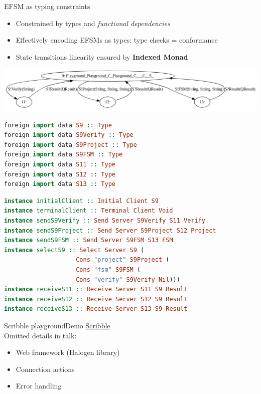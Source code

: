 \documentclass[aspectratio=1610]{beamer}
\begin{document}
\begin{frame}[fragile]{EFSM as typing constraints}
  \begin{itemize}
    \item Constrained by types and \textit{functional dependencies}
    \item Effectively encoding EFSMs as types: type checks = conformance
    \item State transitions linearity ensured by \textbf{Indexed Monad}
  \end{itemize}
  \begin{center}
  \includegraphics[width=0.8\linewidth]{fsm.png}
  \end{center}
  \begin{minipage}{0.40\linewidth}
  \begin{lstlisting}[language=PureScript,style=hask,basicstyle=\tiny\ttfamily]
foreign import data S9 :: Type
foreign import data S9Verify :: Type
foreign import data S9Project :: Type
foreign import data S9FSM :: Type
foreign import data S11 :: Type
foreign import data S12 :: Type
foreign import data S13 :: Type
  \end{lstlisting}
  \end{minipage}
  \begin{minipage}{0.56\linewidth}
  \begin{lstlisting}[language=PureScript,style=hask,basicstyle=\tiny\ttfamily]
instance initialClient :: Initial Client S9
instance terminalClient :: Terminal Client Void
instance sendS9Verify :: Send Server S9Verify S11 Verify
instance sendS9Project :: Send Server S9Project S12 Project
instance sendS9FSM :: Send Server S9FSM S13 FSM
instance selectS9 :: Select Server S9 (
                    Cons "project" S9Project (
                    Cons "fsm" S9FSM (
                    Cons "verify" S9Verify Nil)))
instance receiveS11 :: Receive Server S11 S9 Result
instance receiveS12 :: Receive Server S12 S9 Result
instance receiveS13 :: Receive Server S13 S9 Result
  \end{lstlisting}
  \end{minipage}
\end{frame}

\begin{frame}{Scribble playground}{Demo}
  \href{http://scribble.jlk.co/}{Scribble}
  \\[2ex]
  Omitted details in talk:
  \begin{itemize}
    \item Web framework (Halogen library)
    \item Connection actions
    \item Error handling
  \end{itemize}
\end{frame}
\end{document}
